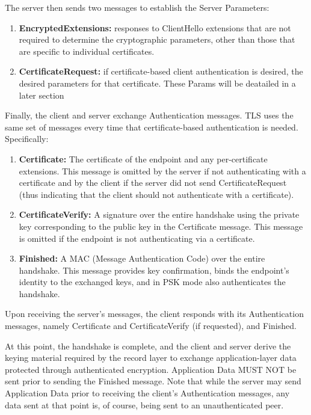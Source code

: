\documentclass{article}
\begin{document}
The server then sends two messages to establish the Server
Parameters:
\begin{enumerate}
    \item \textbf{EncryptedExtensions:}  responses to ClientHello extensions that are
          not required to determine the cryptographic parameters, other than
          those that are specific to individual certificates.
    \item \textbf{CertificateRequest:}  if certificate-based client authentication is
          desired, the desired parameters for that certificate. These Params will be deatailed in a later section
\end{enumerate}

Finally, the client and server exchange Authentication messages.  TLS
uses the same set of messages every time that certificate-based
authentication is needed. Specifically:
\begin{enumerate}
    \item \textbf{Certificate:}  The certificate of the endpoint and any per-certificate
          extensions.  This message is omitted by the server if not
          authenticating with a certificate and by the client if the server
          did not send CertificateRequest (thus indicating that the client
          should not authenticate with a certificate).
    \item \textbf{CertificateVerify:}  A signature over the entire handshake using the
          private key corresponding to the public key in the Certificate
          message.  This message is omitted if the endpoint is not
          authenticating via a certificate.
    \item  \textbf{Finished:}  A MAC (Message Authentication Code) over the entire
          handshake.  This message provides key confirmation, binds the
          endpoint's identity to the exchanged keys, and in PSK mode also
          authenticates the handshake.
\end{enumerate}

Upon receiving the server's messages, the client responds with its
Authentication messages, namely Certificate and CertificateVerify (if
requested), and Finished.

At this point, the handshake is complete, and the client and server
derive the keying material required by the record layer to exchange
application-layer data protected through authenticated encryption.
Application Data MUST NOT be sent prior to sending the Finished
message.  Note that while the server may send Application Data prior
to receiving the client's Authentication messages, any data sent
at that point is, of course, being sent to an unauthenticated peer.
\end{document}
